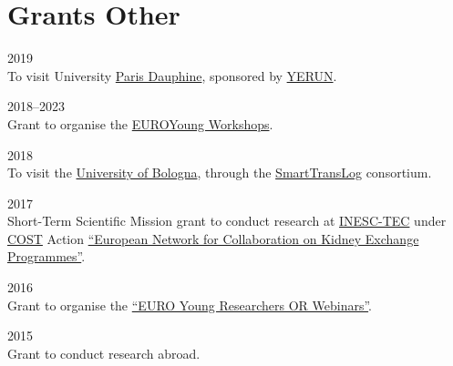 \section*{Grants {\small Other}}

\begin{paracol}{2}
  \textsc{2019}
\switchcolumn
  \\
  To visit University \href{https://www.dauphine.psl.eu/}{Paris Dauphine}, sponsored by \href{https://www.yerun.eu}{YERUN}.
\end{paracol}

\begin{paracol}{2}
  \textsc{2018--2023}
\switchcolumn
  \\
  Grant to organise the \href{https://euroyoung.github.io/}{EUROYoung Workshops}.
\end{paracol}

\begin{paracol}{2}
  \textsc{2018}
\switchcolumn
  \\
  To visit the \href{https://www.unibo.it/}{University of Bologna}, through the \href{https://smarttranslog.wordpress.com/}{SmartTransLog} consortium.
\end{paracol}

\begin{paracol}{2}
  \textsc{2017}
\switchcolumn
  \\
  Short-Term Scientific Mission grant to conduct research at \href{https://www.inesctec.pt/}{INESC-TEC} under \href{http://www.cost.eu/}{COST} Action \href{http://www.enckep-cost.eu/}{``European Network for Collaboration on Kidney Exchange Programmes''}.
\end{paracol}

\begin{paracol}{2}
  \textsc{2016}
\switchcolumn
  \\
  Grant to organise the \href{https://www.airoyoung.org/resources/euro-seminars}{``EURO Young Researchers OR Webinars''}.
\end{paracol}

\begin{paracol}{2}
  \textsc{2015}
\switchcolumn
  \\
  Grant to conduct research abroad.
\end{paracol}